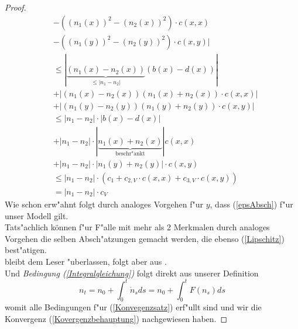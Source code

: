\documentclass[11pt, a4paper, german]{article}
\theoremstyle{plain}
\begin{document}
\begin{proof}
\begin{align*}
			& - ((n_1(x))^2 - (n_2(x))^2) \cdot c(x,x)\\
			& - ((n_1(y))^2 - (n_2(y))^2) \cdot c(x,y) |\\
			& \le  |\underbrace{(n_1(x) - n_2(x))}_{ \le |n_1 - n_2|}(b(x) - d(x)) |\\
			& + | (n_1(x) - n_2(x))(n_1(x) + n_2(x)) \cdot c(x,x) | \\
			& + | (n_1(y) - n_2(y))(n_1(y) + n_2(y)) \cdot c(x,y) |\\
			& \le |n_1 - n_2| \cdot | b(x) - d(x) | \\
			& +  |n_1 - n_2| \cdot |\underbrace{n_1(x) + n_2(x)}_{\text{beschr"ankt}}| c(x,x) \\
			& + |n_1 - n_2| \cdot | n_1(y) + n_2(y) | \cdot c(x,y)\\
			& \le |n_1 - n_2| \cdot ( c_1 + c_{2,V} \cdot c(x,x) + c_{3,V} \cdot c(x,y) )\\
			& = |n_1 - n_2| \cdot c_V
		\end{align*}
		Wie schon erw"ahnt folgt durch analoges Vorgehen f"ur $ y $, dass (\ref{epsAbsch}) f"ur unser Modell gilt.\\ 
		Tats"achlich können f"ur F"alle mit mehr als 2 Merkmalen durch analoges Vorgehen die selben Absch"atzungen gemacht werden, die ebenso (\ref{Lipschitz}) best"atigen.\\
		
		\textit{\cite[Kapitel 11 - (2.3)]{ethier2009markov}} bleibt dem Leser "uberlassen, folgt aber aus \cite[Kapitel 6 - (2.1)]{ethier2009markov}.\\
		Und \textit{Bedingung (\ref{Integralgleichung})} folgt direkt aus unserer Definition
		\[ n_t = n_0 + \int_{0}^{t} \dot{n}_s ds = n_0 + \int_{0}^{t} F(n_s) ds \]
		womit alle Bedingungen f"ur (\ref{Konvegenzsatz}) erf"ullt sind und wir die Konvergenz (\ref{Kovergenzbehauptung}) nachgewiesen haben.
	\end{proof}
	
\end{document}
